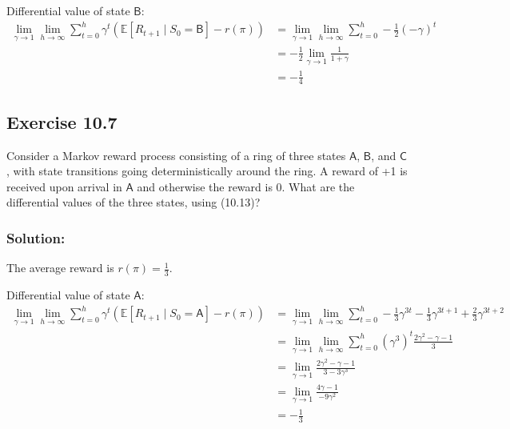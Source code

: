 Differential value of state $\mathsf{B}$:
\begin{align*}
    \lim_{\gamma \rightarrow 1} \lim_{h \rightarrow \infty} \sum_{t=0}^{h} \gamma^t \left( \mathbb{E} \left[ R_{t+1} \mid S_0 = \mathsf{B} \right] - r(\pi) \right) &=  \lim_{\gamma \rightarrow 1} \lim_{h \rightarrow \infty} \sum_{t=0}^{h} -\frac{1}{2}\left(-\gamma\right)^t \\
    &= -\frac{1}{2}\lim_{\gamma \rightarrow 1} \frac{1}{1 + \gamma} \\
    &= -\frac{1}{4}
\end{align*}

\subsection*{Exercise 10.7}

Consider a Markov reward process consisting of a ring of three states $\mathsf{A}$, $\mathsf{B}$,
and $\mathsf{C}$, with state transitions going deterministically around the ring. A reward of +1 is
received upon arrival in $\mathsf{A}$ and otherwise the reward is 0. What are the differential values
of the three states, using (10.13)? 

\subsubsection*{Solution:}
The average reward is $r(\pi)=\frac{1}{3}$.

Differential value of state $\mathsf{A}$:
\begin{align*}
    \lim_{\gamma \rightarrow 1} \lim_{h \rightarrow \infty} \sum_{t=0}^{h} \gamma^t \left( \mathbb{E} \left[ R_{t+1} \mid S_0 = \mathsf{A} \right] - r(\pi) \right) &=  \lim_{\gamma \rightarrow 1} \lim_{h \rightarrow \infty} \sum_{t=0}^{h} -\frac{1}{3} \gamma^{3t} -\frac{1}{3} \gamma^{3t+1}  + \frac{2}{3} \gamma^{3t+2} \\
    &= \lim_{\gamma \rightarrow 1} \lim_{h \rightarrow \infty} \sum_{t=0}^{h} (\gamma^3)^t \frac{2\gamma^2 - \gamma - 1}{3} \\
    &= \lim_{\gamma \rightarrow 1} \frac{2\gamma^2 - \gamma - 1}{3 - 3\gamma^3} \\
    &= \lim_{\gamma \rightarrow 1} \frac{4\gamma - 1}{-9\gamma^2} \\
    &= - \frac{1}{3}
\end{align*}

